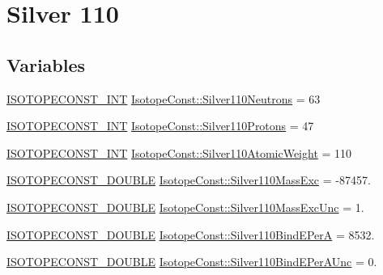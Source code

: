 \hypertarget{group___isotope_const-_silver-_ag110}{}\section{Silver 110}
\label{group___isotope_const-_silver-_ag110}
\subsection*{Variables}
\begin{DoxyCompactItemize}
\item 
\mbox{\hyperlink{group___isotope_const-_macros_ga5f18360b3e99483a35c32d789e62621c}{I\+S\+O\+T\+O\+P\+E\+C\+O\+N\+S\+T\+\_\+\+I\+NT}} \mbox{\hyperlink{group___isotope_const-_silver-_ag110_ga13271a344fc9127c695addf24b5ca4db}{Isotope\+Const\+::\+Silver110\+Neutrons}} = 63
\item 
\mbox{\hyperlink{group___isotope_const-_macros_ga5f18360b3e99483a35c32d789e62621c}{I\+S\+O\+T\+O\+P\+E\+C\+O\+N\+S\+T\+\_\+\+I\+NT}} \mbox{\hyperlink{group___isotope_const-_silver-_ag110_ga6c13ff82dffaabb5571b8b3fdbe4544d}{Isotope\+Const\+::\+Silver110\+Protons}} = 47
\item 
\mbox{\hyperlink{group___isotope_const-_macros_ga5f18360b3e99483a35c32d789e62621c}{I\+S\+O\+T\+O\+P\+E\+C\+O\+N\+S\+T\+\_\+\+I\+NT}} \mbox{\hyperlink{group___isotope_const-_silver-_ag110_ga2ab2cf5dc28d550638c39ece144fb6e5}{Isotope\+Const\+::\+Silver110\+Atomic\+Weight}} = 110
\item 
\mbox{\hyperlink{group___isotope_const-_macros_ga8f45a7272ce02c0b4c65c44636ed719a}{I\+S\+O\+T\+O\+P\+E\+C\+O\+N\+S\+T\+\_\+\+D\+O\+U\+B\+LE}} \mbox{\hyperlink{group___isotope_const-_silver-_ag110_ga3a787c3424945ba1c03c0e7495b5238e}{Isotope\+Const\+::\+Silver110\+Mass\+Exc}} = -\/87457.
\item 
\mbox{\hyperlink{group___isotope_const-_macros_ga8f45a7272ce02c0b4c65c44636ed719a}{I\+S\+O\+T\+O\+P\+E\+C\+O\+N\+S\+T\+\_\+\+D\+O\+U\+B\+LE}} \mbox{\hyperlink{group___isotope_const-_silver-_ag110_gac8a336a7c019a83d9c2d7baef2f080ff}{Isotope\+Const\+::\+Silver110\+Mass\+Exc\+Unc}} = 1.
\item 
\mbox{\hyperlink{group___isotope_const-_macros_ga8f45a7272ce02c0b4c65c44636ed719a}{I\+S\+O\+T\+O\+P\+E\+C\+O\+N\+S\+T\+\_\+\+D\+O\+U\+B\+LE}} \mbox{\hyperlink{group___isotope_const-_silver-_ag110_ga7d7b8bed534972d65eddb012c4d6d40c}{Isotope\+Const\+::\+Silver110\+Bind\+E\+PerA}} = 8532.
\item 
\mbox{\hyperlink{group___isotope_const-_macros_ga8f45a7272ce02c0b4c65c44636ed719a}{I\+S\+O\+T\+O\+P\+E\+C\+O\+N\+S\+T\+\_\+\+D\+O\+U\+B\+LE}} \mbox{\hyperlink{group___isotope_const-_silver-_ag110_ga780237954538d682dc2d3b1e63bc5094}{Isotope\+Const\+::\+Silver110\+Bind\+E\+Per\+A\+Unc}} = 0.

\end{DoxyCompactItemize}
